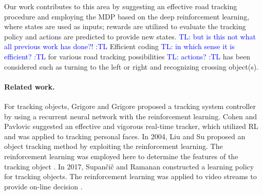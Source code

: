 \documentclass{svproc}
\newcommand{\tl}[1]{\textcolor{blue} {TL: #1 :TL} }
\begin{document}

Our work contributes to this area by suggesting an effective road tracking procedure and employing the MDP based on the deep reinforcement learning, where states are used as inputs; rewards are utilized to evaluate the tracking policy and actions are predicted to provide new states. \tl{but is this not what all previous work has done?!} Efficient coding \tl{in which sense it is efficient?} for various road tracking possibilities \tl{actions?} has been considered such as turning to the left or right and recognizing crossing object(s). 






\paragraph{Related work.}  %
For tracking objects, Grigore and Grigore \cite{Grigore2000Reinforcement} proposed a tracking system controller by using a recurrent neural network with the reinforcement learning. %
Cohen and Pavlovic \cite{Cohen2010Reinforcement} suggested an effective and vigorous real-time tracker, which utilized RL and was applied to tracking personal faces. In 2004, Liu and Su proposed an object tracking method by exploiting the reinforcement learning. The reinforcement learning was employed here to determine the features of the tracking object \cite{Liu2004Reinforcement}. In 2017, Supan\v{c}i\v{c} and Ramanan constructed a learning policy for tracking objects. The reinforcement learning was applied to video streams to provide on-line decision \cite{Supancic2017Tracking}. 
	
\end{document}
